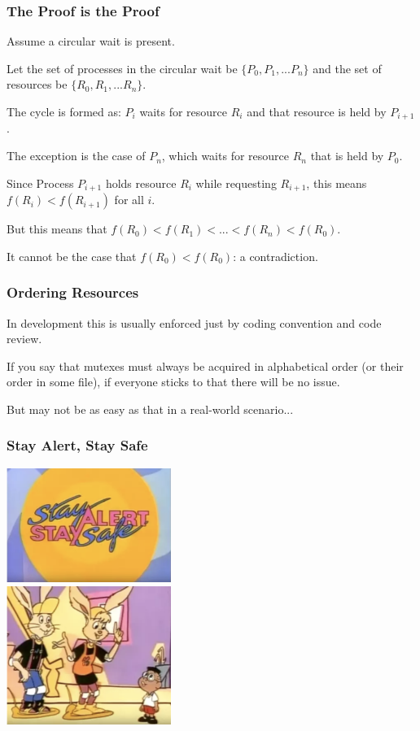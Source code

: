 \begin{frame}
	\frametitle{The Proof is the Proof}

	Assume a circular wait is present.

	Let the set of processes in the circular wait be $\{P_{0}, P_{1}, ... P_{n}\}$ and the set of resources be $\{R_{0}, R_{1}, ... R_{n}\}$.

	The cycle is formed as: $P_{i}$ waits for resource $R_{i}$ and that resource is held by $P_{i+1}$.

	The exception is the case of $P_{n}$, which waits for resource $R_{n}$ that is held by $P_{0}$.

	Since Process $P_{i+1}$ holds resource $R_{i}$ while requesting $R_{i+1}$, this means $f(R_{i}) < f(R_{i+1})$ for all $i$.

	But this means that $f(R_{0}) < f(R_{1}) < ... < f(R_{n}) < f(R_{0})$.

	It cannot be the case that $f(R_{0}) < f(R_{0})$: a contradiction.

\end{frame}

\begin{frame}
	\frametitle{Ordering Resources}

	In development this is usually enforced just by coding convention and code review.

	If you say that mutexes must always be acquired in alphabetical order (or their order in some file), if everyone sticks to that there will be no issue.

	But may not be as easy as that in a real-world scenario...

\end{frame}


\begin{frame}
	\frametitle{Stay Alert, Stay Safe}

	\begin{center}
		\includegraphics[width=0.4\textwidth]{images/sass1.png}\\
		\includegraphics[width=0.4\textwidth]{images/sass2.png}
	\end{center}


\end{frame}


